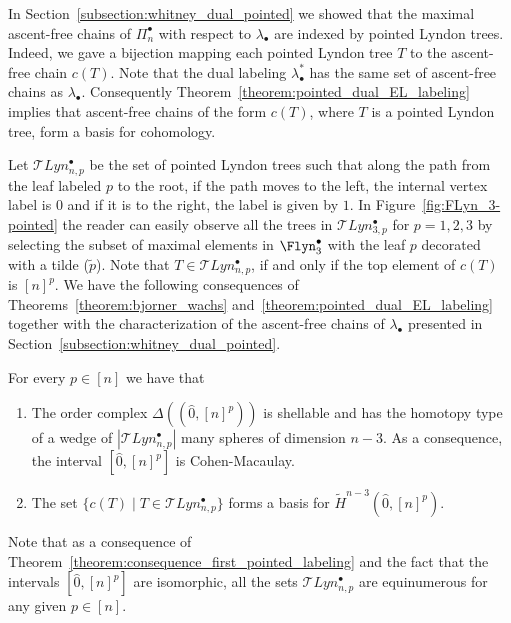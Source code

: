      
     In Section~\ref{subsection:whitney_dual_pointed} we showed that the maximal ascent-free chains of   $\Pi_n^\bullet$ with respect to $\lambda_{\bullet}$ are indexed by pointed Lyndon trees. Indeed, we gave a bijection mapping each pointed Lyndon tree $T$ to the ascent-free chain $c(T)$. Note that the dual labeling $\lambda^*_{\bullet}$ has the same set of ascent-free chains as $\lambda_{\bullet}$. Consequently Theorem~\ref{theorem:pointed_dual_EL_labeling} implies that ascent-free chains of the form $c(T)$, where $T$ is a pointed Lyndon tree, form a basis for cohomology.
     
     

     
     Let  $\mathcal{T}Lyn_{n,p}^{\bullet}$ be the set of pointed Lyndon trees such that along the path from the leaf labeled $p$ to the root, if the path moves to the left, the internal vertex label is $0$ and if it is to the right, the label is given by $1$. In Figure~\ref{fig:FLyn_3-pointed} the reader can easily observe all the trees in $\mathcal{T}Lyn_{3,p}^{\bullet}$ for  $p=1,2,3$ by selecting the subset of maximal elements in $\Flyn_3^{\bullet}$ with the leaf $p$ decorated with a tilde ($\tilde{p}$). Note that $T\in  \mathcal{T}Lyn_{n,p}^{\bullet}$, if and only if the top element of $c(T)$ is $[n]^p$. We have the following consequences of Theorems~\ref{theorem:bjorner_wachs} and~\ref{theorem:pointed_dual_EL_labeling} together with the characterization of the ascent-free chains of $\lambda_{\bullet}$ presented in Section~\ref{subsection:whitney_dual_pointed}.
     


\begin{theo}\label{theorem:consequence_first_pointed_labeling} 
  For every $p\in [n]$ we have that
 \begin{enumerate}
   \item   The order complex $\Delta((\hat{0},[n]^p))$ is shellable and has the homotopy type of a wedge of $| \mathcal{T}Lyn_{n,p}^{\bullet}|$ many spheres of dimension $n-3$. As a consequence, the interval $[\hat{0},[n]^p]$ is Cohen-Macaulay.

\item The set
$ \{c(T) \mid T\in \mathcal{T}Lyn_{n,p}^{\bullet}\}$ forms a basis for $\widetilde H^{n-3}(\hat{0},[n]^p)$.
 \end{enumerate}
\end{theo}

\begin{rema}
    Note that as a consequence of Theorem~\ref{theorem:consequence_first_pointed_labeling} and the fact that the intervals $[\hat{0},[n]^p]$ are  isomorphic,   all the sets  $\mathcal{T}Lyn_{n,p}^{\bullet}$ are  equinumerous for any given $p\in [n]$.
\end{rema}


